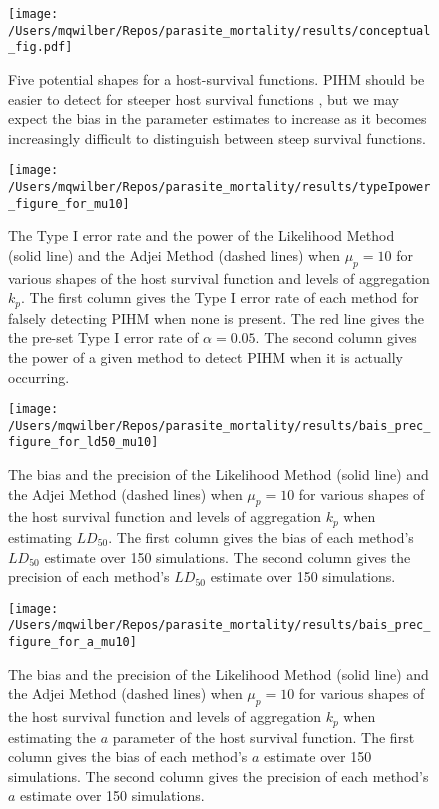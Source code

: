 \documentclass[12pt, a4paper]{article}
\begin{document}
\begin{figure}
    \texttt{[image: /Users/mqwilber/Repos/parasite\_mortality/results/conceptual\_fig.pdf]}

    \caption{Five potential shapes for a host-survival functions. PIHM should be easier to detect for steeper host survival functions \citep{Lanciani1989}, but we may expect the bias in the parameter estimates to increase as it becomes increasingly difficult to distinguish between steep survival functions.}
    \label{fig:surv}
\end{figure}

\begin{figure}

    \texttt{[image: /Users/mqwilber/Repos/parasite\_mortality/results/typeIpower\_figure\_for\_mu10]}

    \caption{The Type I error rate and the power of the Likelihood Method (solid line) and the Adjei Method (dashed lines) when $\mu_p = 10$ for various shapes of the host survival function and levels of aggregation $k_p$.  The first column gives the Type I error rate of each method for falsely detecting PIHM when none is present.  The red line gives the the pre-set Type I error rate of $\alpha = 0.05$.  The second column gives the power of a given method to detect PIHM when it is actually occurring. }
    \label{fig:typeI10}

\end{figure}


\begin{figure}

    \texttt{[image: /Users/mqwilber/Repos/parasite\_mortality/results/bais\_prec\_figure\_for\_ld50\_mu10]}

    \caption{The bias and the precision of the Likelihood Method (solid line) and the Adjei Method (dashed lines) when $\mu_p = 10$ for various shapes of the host survival function and levels of aggregation $k_p$ when estimating $LD_{50}$.  The first column gives the bias of each method's $LD_{50}$ estimate over 150 simulations. The second column gives the precision of each method's $LD_{50}$ estimate over 150 simulations.}

    \label{fig:biasld50}

\end{figure}

\begin{figure}

    \texttt{[image: /Users/mqwilber/Repos/parasite\_mortality/results/bais\_prec\_figure\_for\_a\_mu10]}

    \caption{The bias and the precision of the Likelihood Method (solid line) and the Adjei Method (dashed lines) when $\mu_p = 10$ for various shapes of the host survival function and levels of aggregation $k_p$ when estimating the $a$ parameter of the host survival function.  The first column gives the bias of each method's $a$ estimate over 150 simulations. The second column gives the precision of each method's $a$ estimate over 150 simulations.}

    \label{fig:biasa}

\end{figure}
\end{document}
